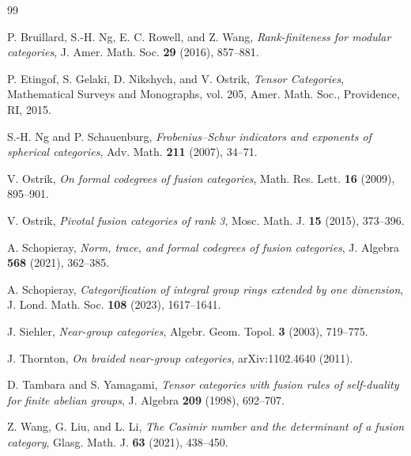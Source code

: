 \documentclass[a4paper,twoside,11pt]{amsart}
\theoremstyle{plain} %
\theoremstyle{definition}
\begin{document}
\begin{thebibliography}{99}

P. Bruillard, S.-H. Ng, E. C. Rowell, and Z. Wang,
\emph{Rank-finiteness for modular categories},
J. Amer. Math. Soc. \textbf{29} (2016), 857--881.



P. Etingof, S. Gelaki, D. Nikshych, and V. Ostrik,
\emph{Tensor Categories},
Mathematical Surveys and Monographs, vol. 205,
Amer. Math. Soc., Providence, RI, 2015.



S.-H. Ng and P. Schauenburg,
\emph{Frobenius--Schur indicators and exponents of spherical categories},
Adv. Math. \textbf{211} (2007), 34--71.

V. Ostrik,
\emph{On formal codegrees of fusion categories},
Math. Res. Lett. \textbf{16} (2009), 895--901.

V. Ostrik,
\emph{Pivotal fusion categories of rank 3},
Mosc. Math. J. \textbf{15} (2015), 373--396.

A. Schopieray,
\emph{Norm, trace, and formal codegrees of fusion categories},
J. Algebra \textbf{568} (2021), 362--385.



A. Schopieray,
\emph{Categorification of integral group rings extended by one dimension},
J. Lond. Math. Soc. \textbf{108} (2023), 1617--1641.




J. Siehler,
\emph{Near-group categories},
Algebr. Geom. Topol. \textbf{3} (2003), 719--775.

 J. Thornton, \textit{On braided near-group categories}, arXiv:1102.4640 (2011).

D. Tambara and S. Yamagami,
\emph{Tensor categories with fusion rules of self-duality for finite abelian groups},
J. Algebra \textbf{209} (1998), 692--707.

Z. Wang, G. Liu, and L. Li,
\emph{The Casimir number and the determinant of a fusion category},
Glasg. Math. J. \textbf{63} (2021), 438--450.

\end{thebibliography}








 
\end{document}
